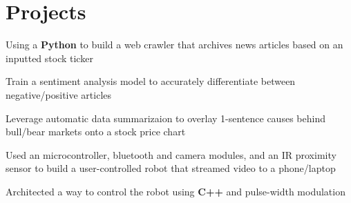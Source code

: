 \documentclass[letterpaper]{deedy-resume} %
\begin{document}
\begin{minipage}[t]{0.66\textwidth}

  \section{Projects}
%  
%  
%

  \begin{tightitemize}
  \item Using a \textbf{Python} to build a web crawler that archives news articles based on an inputted stock ticker
  \item Train a sentiment analysis model to accurately differentiate between negative/positive articles
  \item Leverage automatic data summarizaion to overlay 1-sentence causes behind bull/bear markets onto a stock price chart
  \end{tightitemize}


  \begin{tightitemize}
  \item Used an microcontroller, bluetooth and camera modules, and an IR proximity sensor to build a user-controlled robot that streamed video to a phone/laptop
  \item Architected a way to control the robot using \textbf{C++} and pulse-width modulation
  \end{tightitemize}
  
%
%

\end{minipage} %
\end{document}
